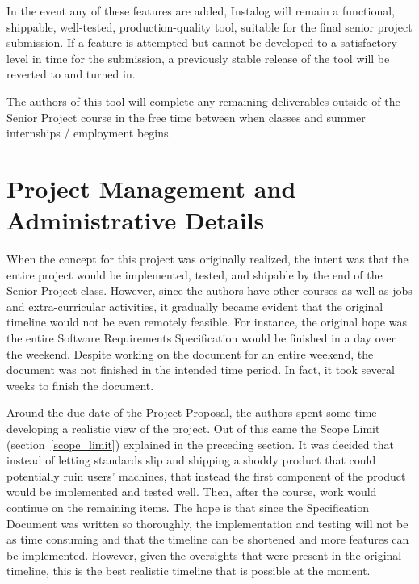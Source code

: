 \documentclass[letterpaper,12pt]{article}
\begin{document}
In the event any of these features are added, Instalog will remain a functional,
shippable, well-tested, production-quality tool, suitable for the final senior
project submission.  If a feature is attempted but cannot be developed to a
satisfactory level in time for the submission, a previously stable release of
the tool will be reverted to and turned in.  

The authors of this tool will complete any remaining deliverables outside of the
Senior Project course in the free time between when classes and summer
internships / employment begins.  

\newpage



\section{Project Management and Administrative Details}
\label{project_management} 
When the concept for this project was originally realized, the intent was that
the entire project would be implemented, tested, and shipable by the end of the
Senior Project class.  However, since the authors have other courses as well as
jobs and extra-curricular activities, it gradually became evident that the
original timeline would not be even remotely feasible.  For instance, the
original hope was the entire Software Requirements Specification
\cite{Specification} would be finished in a day over the weekend.  Despite
working on the document for an entire weekend, the document was not finished in
the intended time period.  In fact, it took several weeks to finish the
document.  

Around the due date of the Project Proposal, the authors spent some time
developing a realistic view of the project.  Out of this came the Scope Limit
(section~\ref{scope_limit}) explained in the preceding section.  It was decided
that instead of letting standards slip and shipping a shoddy product that could
potentially ruin users' machines, that instead the first component of the
product would be implemented and tested well.  Then, after the course, work
would continue on the remaining items.  The hope is that since the Specification
Document was written so thoroughly, the implementation and testing will not be
as time consuming and that the timeline can be shortened and more features can
be implemented.  However, given the oversights that were present in the original
timeline, this is the best realistic timeline that is possible at the moment.  
\end{document}
